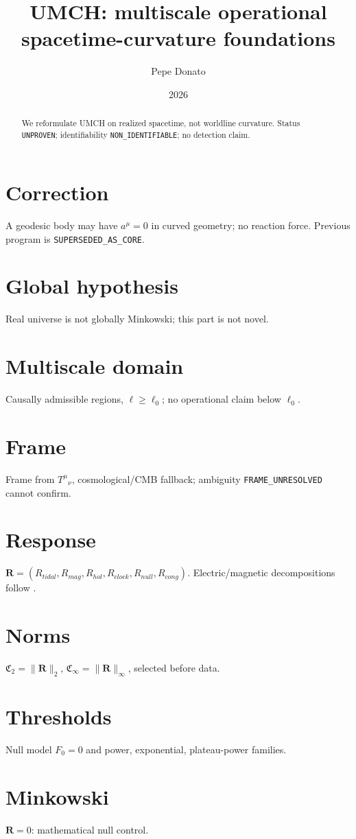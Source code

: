 \documentclass[11pt,a4paper]{article}\usepackage[utf8]{inputenc}\usepackage[T1]{fontenc}\usepackage[english]{babel}\usepackage{amsmath,amssymb,geometry,hyperref}\geometry{margin=2.7cm}
\title{UMCH: multiscale operational spacetime-curvature foundations}\author{Pepe Donato}\date{2026}
\begin{document}
\maketitle
\begin{abstract}We reformulate UMCH on realized spacetime, not worldline curvature. Status \texttt{UNPROVEN}; identifiability \texttt{NON\_IDENTIFIABLE}; no detection claim.\end{abstract}
\section{Correction}\label{sec:st-correction}A geodesic body may have $a^\mu=0$ in curved geometry; no reaction force. Previous program is \texttt{SUPERSEDED\_AS\_CORE}.
\section{Global hypothesis}\label{sec:st-global}Real universe is not globally Minkowski; this part is not novel.
\section{Multiscale domain}\label{sec:st-domain}Causally admissible regions, $\ell\ge\ell_0$; no operational claim below $\ell_0$.
\section{Frame}\label{sec:st-frame}Frame from $T^\mu{}_\nu$, cosmological/CMB fallback; ambiguity \texttt{FRAME\_UNRESOLVED} cannot confirm.
\section{Response}\label{sec:st-response}$\mathbf R=(R_{tidal},R_{mag},R_{hol},R_{clock},R_{null},R_{cong})$. Electric/magnetic decompositions follow \cite{Bonnor1995,MaartensBassett1998}.
\section{Norms}\label{sec:st-norms}$\mathfrak C_2=\|\mathbf R\|_2$, $\mathfrak C_\infty=\|\mathbf R\|_\infty$, selected before data.
\section{Thresholds}\label{sec:st-thresholds}Null model $F_0=0$ and power, exponential, plateau-power families.
\section{Minkowski}\label{sec:st-minkowski}$\mathbf R=0$: mathematical null control.
\end{document}
